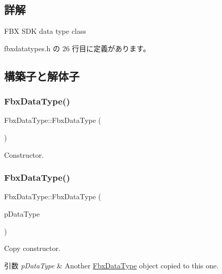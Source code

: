 \subsection{詳解}
F\+BX S\+DK data type class 

 fbxdatatypes.\+h の 26 行目に定義があります。



\subsection{構築子と解体子}
\mbox{\label{class_fbx_data_type_a3441ba1df35e11f7598146731bc70d70}} 
\subsubsection{\texorpdfstring{Fbx\+Data\+Type()}{FbxDataType()}\hspace{0.1cm}{\footnotesize\ttfamily [1/3]}}
{\footnotesize\ttfamily Fbx\+Data\+Type\+::\+Fbx\+Data\+Type (\begin{DoxyParamCaption}{ }\end{DoxyParamCaption})}



Constructor. 

\mbox{\label{class_fbx_data_type_ae711414e8450866b24a0c879bf5c0166}} 
\subsubsection{\texorpdfstring{Fbx\+Data\+Type()}{FbxDataType()}\hspace{0.1cm}{\footnotesize\ttfamily [2/3]}}
{\footnotesize\ttfamily Fbx\+Data\+Type\+::\+Fbx\+Data\+Type (\begin{DoxyParamCaption}\item[{const \hyperlink{class_fbx_data_type}{Fbx\+Data\+Type} \&}]{p\+Data\+Type }\end{DoxyParamCaption})}

Copy constructor. 
\begin{DoxyParams}{引数}
{\em p\+Data\+Type} & Another \hyperlink{class_fbx_data_type}{Fbx\+Data\+Type} object copied to this one. \\
\hline
\end{DoxyParams}
\mbox{\label{class_fbx_data_type_a40dc7c9a1670c754e1e31394eabec7b7}} 
